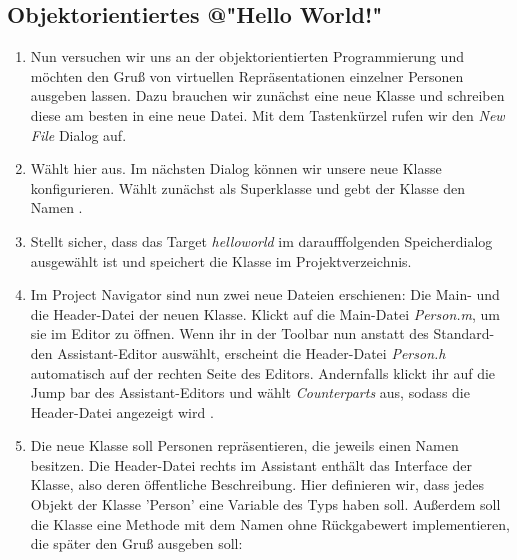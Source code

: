 \documentclass[parskip=half, final]{scrreprt}
\begin{document}
\begin{lecture} %


\section{Objektorientiertes @"{}Hello World!"{}}

\begin{enumerate}

\item Nun versuchen wir uns an der objektorientierten Programmierung und möchten den  Gruß von virtuellen Repräsentationen einzelner Personen ausgeben lassen. Dazu brauchen wir zunächst eine neue Klasse  und schreiben diese am besten in eine neue Datei. Mit dem Tastenkürzel  rufen wir den \emph{New File} Dialog auf.

\item Wählt hier  aus. Im nächsten Dialog können wir unsere neue Klasse konfigurieren. Wählt zunächst  als Superklasse und gebt der Klasse den Namen  .


\item Stellt sicher, dass das Target \emph{helloworld} im daraufffolgenden Speicherdialog ausgewählt ist und speichert die Klasse im Projektverzeichnis.

\item Im Project Navigator sind nun zwei neue Dateien erschienen: Die Main- und die Header-Datei der neuen Klasse. Klickt auf die Main-Datei \emph{Person.m}, um sie im Editor zu öffnen. Wenn ihr in der Toolbar nun anstatt des Standard- den Assistant-Editor auswählt, erscheint die Header-Datei \emph{Person.h} automatisch auf der rechten Seite des Editors. Andernfalls klickt ihr auf die Jump bar des Assistant-Editors und wählt \emph{Counterparts} aus, sodass die Header-Datei angezeigt wird .


\item Die neue Klasse soll Personen repräsentieren, die jeweils einen Namen besitzen. Die Header-Datei rechts im Assistant enthält das Interface der Klasse, also deren öffentliche Beschreibung. Hier definieren wir, dass jedes Objekt der Klasse 'Person' eine Variable  des Typs  haben soll. Außerdem soll die Klasse eine Methode mit dem Namen  ohne Rückgabewert implementieren, die später den Gruß ausgeben soll:


\end{enumerate}
\end{lecture}
\end{document}
